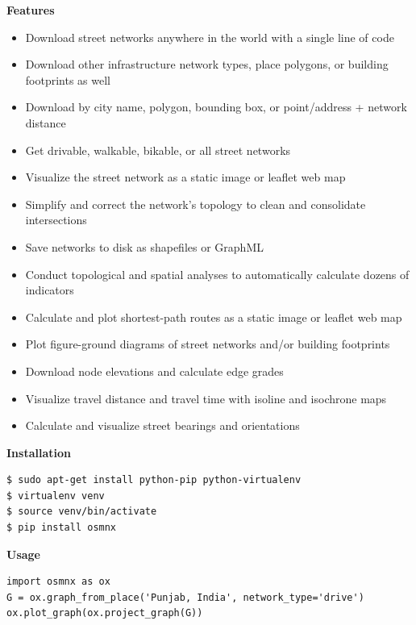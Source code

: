 {\bf Features}
\begin{itemize}
\item Download street networks anywhere in the world with a single line of code
\item Download other infrastructure network types, place polygons, or building footprints as well
\item Download by city name, polygon, bounding box, or point/address + network distance
\item Get drivable, walkable, bikable, or all street networks
\item Visualize the street network as a static image or leaflet web map
\item Simplify and correct the network’s topology to clean and consolidate intersections
\item Save networks to disk as shapefiles or GraphML
\item Conduct topological and spatial analyses to automatically calculate dozens of indicators
\item Calculate and plot shortest-path routes as a static image or leaflet web map
\item Plot figure-ground diagrams of street networks and/or building footprints
\item Download node elevations and calculate edge grades
\item Visualize travel distance and travel time with isoline and isochrone maps
\item Calculate and visualize street bearings and orientations\\

\end{itemize}


{\bf Installation}
\begin{verbatim}
$ sudo apt-get install python-pip python-virtualenv
$ virtualenv venv
$ source venv/bin/activate
$ pip install osmnx
\end{verbatim}

{\bf Usage}
\begin{verbatim}
import osmnx as ox
G = ox.graph_from_place('Punjab, India', network_type='drive')
ox.plot_graph(ox.project_graph(G))
\end{verbatim}